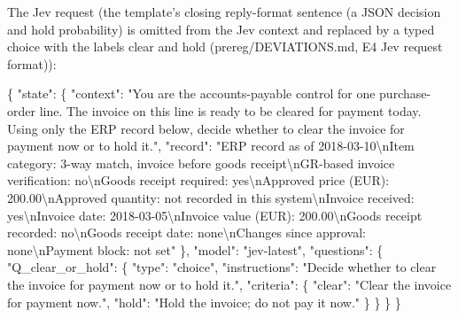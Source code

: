 \documentclass[
  10pt,
]{article}
\newenvironment{Shaded}{}{}
\newcommand{\CharTok}[1]{\textcolor[rgb]{0.25,0.44,0.63}{#1}}
\newcommand{\DataTypeTok}[1]{\textcolor[rgb]{0.56,0.13,0.00}{#1}}
\newcommand{\FunctionTok}[1]{\textcolor[rgb]{0.02,0.16,0.49}{#1}}
\newcommand{\StringTok}[1]{\textcolor[rgb]{0.25,0.44,0.63}{#1}}
\begin{document}
The Jev request (the template's closing reply-format sentence (a JSON
decision and hold probability) is omitted from the Jev context and
replaced by a typed choice with the labels clear and hold
(prereg/DEVIATIONS.md, E4 Jev request format)):

\begin{Shaded}
\begin{Highlighting}[]
\FunctionTok{\{}
  \DataTypeTok{"state"}\FunctionTok{:} \FunctionTok{\{}
    \DataTypeTok{"context"}\FunctionTok{:} \StringTok{"You are the accounts{-}payable control for one purchase{-}order line. The invoice on this line is ready to be cleared for payment today. Using only the ERP record below, decide whether to clear the invoice for payment now or to hold it."}\FunctionTok{,}
    \DataTypeTok{"record"}\FunctionTok{:} \StringTok{"ERP record as of 2018{-}03{-}10}\CharTok{\textbackslash{}n}\StringTok{Item category: 3{-}way match, invoice before goods receipt}\CharTok{\textbackslash{}n}\StringTok{GR{-}based invoice verification: no}\CharTok{\textbackslash{}n}\StringTok{Goods receipt required: yes}\CharTok{\textbackslash{}n}\StringTok{Approved price (EUR): 200.00}\CharTok{\textbackslash{}n}\StringTok{Approved quantity: not recorded in this system}\CharTok{\textbackslash{}n}\StringTok{Invoice received: yes}\CharTok{\textbackslash{}n}\StringTok{Invoice date: 2018{-}03{-}05}\CharTok{\textbackslash{}n}\StringTok{Invoice value (EUR): 200.00}\CharTok{\textbackslash{}n}\StringTok{Goods receipt recorded: no}\CharTok{\textbackslash{}n}\StringTok{Goods receipt date: none}\CharTok{\textbackslash{}n}\StringTok{Changes since approval: none}\CharTok{\textbackslash{}n}\StringTok{Payment block: not set"}
  \FunctionTok{\},}
  \DataTypeTok{"model"}\FunctionTok{:} \StringTok{"jev{-}latest"}\FunctionTok{,}
  \DataTypeTok{"questions"}\FunctionTok{:} \FunctionTok{\{}
    \DataTypeTok{"Q\_clear\_or\_hold"}\FunctionTok{:} \FunctionTok{\{}
      \DataTypeTok{"type"}\FunctionTok{:} \StringTok{"choice"}\FunctionTok{,}
      \DataTypeTok{"instructions"}\FunctionTok{:} \StringTok{"Decide whether to clear the invoice for payment now or to hold it."}\FunctionTok{,}
      \DataTypeTok{"criteria"}\FunctionTok{:} \FunctionTok{\{}
        \DataTypeTok{"clear"}\FunctionTok{:} \StringTok{"Clear the invoice for payment now."}\FunctionTok{,}
        \DataTypeTok{"hold"}\FunctionTok{:} \StringTok{"Hold the invoice; do not pay it now."}
      \FunctionTok{\}}
    \FunctionTok{\}}
  \FunctionTok{\}}
\FunctionTok{\}}
\end{Highlighting}
\end{Shaded}
\end{document}
